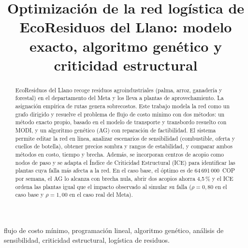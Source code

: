 \documentclass[conference]{IEEEtran}
\begin{document}
\title{Optimización de la red logística de EcoResiduos del Llano: modelo exacto, algoritmo genético y criticidad estructural}

\author{
}

\maketitle

\begin{abstract}
EcoResiduos del Llano recoge residuos agroindustriales (palma, arroz, ganadería y forestal) en el
departamento del Meta y los lleva a plantas de aprovechamiento. La asignación empírica de rutas
genera sobrecostos. Este trabajo modela la red como un grafo dirigido y resuelve el problema de flujo
de costo mínimo con dos métodos: un método exacto propio, basado en el modelo de transporte y
transbordo resuelto con MODI, y un algoritmo genético (AG) con reparación de factibilidad. El sistema permite editar la red en línea, analizar escenarios
de sensibilidad (combustible, oferta y cuellos de botella), obtener precios sombra y rangos de
estabilidad, y comparar ambos métodos en costo, tiempo y brecha. Además, se incorporan centros de
acopio como nodos de paso y se adapta el Índice de Criticidad Estructural (ICE) para identificar las
plantas cuya falla más afecta a la red. En el caso base, el óptimo es de 64\,691\,000~COP por semana,
el AG lo alcanza con brecha nula, abrir dos acopios ahorra 4{,}5\,\% y el ICE ordena las plantas igual
que el impacto observado al simular su falla ($\rho = 0{,}80$ en el caso base y $\rho = 1{,}00$ en el
caso real del Meta).
\end{abstract}

\begin{IEEEkeywords}
flujo de costo mínimo, programación lineal, algoritmo genético, análisis de sensibilidad,
criticidad estructural, logística de residuos.
\end{IEEEkeywords}
\end{document}
